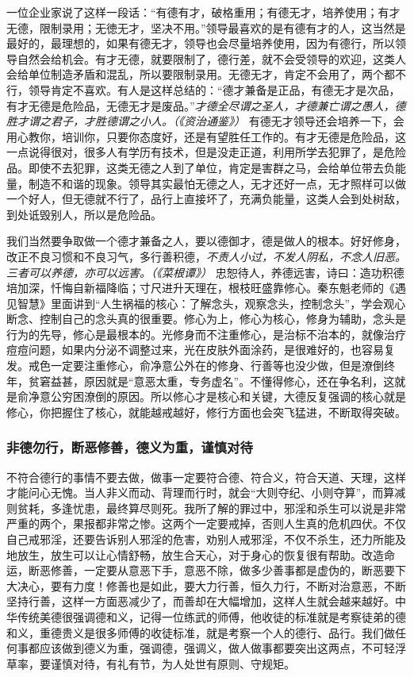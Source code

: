 一位企业家说了这样一段话：“有德有才，破格重用；有德无才，培养使用；有才无德，限制录用；无徳无才，坚决不用。”领导最喜欢的是有德有才的人，这当然是最好的，最理想的，如果有德无才，领导也会尽量培养使用，因为有德行，所以领导自然会给机会。有才无德，就要限制了，德行差，就不会受领导的欢迎，这类人会给单位制造矛盾和混乱，所以要限制录用。无德无才，肯定不会用了，两个都不行，领导肯定不喜欢。有人是这样总结的：“德才兼备是正品，有德无才是次品，有才无德是危险品，无德无才是废品。”\textit{才德全尽谓之圣人，才德兼亡谓之愚人，德胜才谓之君子，才胜德谓之小人。（《资治通鉴》）} 有德无才领导还会培养一下，会用心教你，培训你，只要你态度好，还是有望胜任工作的。有才无德是危险品，这一点说得很对，很多人有学历有技术，但是没走正道，利用所学去犯罪了，是危险品。即使不去犯罪，这类无德之人到了单位，肯定是害群之马，会给单位带去负能量，制造不和谐的现象。领导其实最怕无德之人，无才还好一点，无才照样可以做一个好人，但无德就不行了，品行上直接坏了，充满负能量，这类人会到处树敌，到处诋毁别人，所以是危险品。

我们当然要争取做一个德才兼备之人，要以德御才，德是做人的根本。好好修身，改正不良习惯和不良习气，多行善积德，\textit{不责人小过，不发人阴私，不念人旧恶。三者可以养德，亦可以远害。（《菜根谭》）} 忠恕待人，养德远害，诗曰：造功积德培加深，忏悔自新福降临；寸尺进升天理在，根枝旺盛靠修心。秦东魁老师的《遇见智慧》里面讲到“人生祸福的核心：了解念头，观察念头，控制念头”，学会观心断念、控制自己的念头真的很重要。修心为上，修心为核心，修身为辅助，念头是行为的先导，修心是最根本的。光修身而不注重修心，是治标不治本的，就像治疗痘痘问题，如果内分泌不调整过来，光在皮肤外面涂药，是很难好的，也容易复发。戒色一定要注重修心，俞净意公外在的修身、行善等也没少做，但是潦倒终年，贫窘益甚，原因就是“意恶太重，专务虚名”。不懂得修心，还在争名利，这就是俞净意公穷困潦倒的原因。所以修心才是核心和关键，大德反复强调的核心就是修心，你把握住了核心，就能越戒越好，修行方面也会突飞猛进，不断取得突破。

\subsubsection{非德勿行，断恶修善，德义为重，谨慎对待}

不符合德行的事情不要去做，做事一定要符合德、符合义，符合天道、天理，这样才能问心无愧。当人非义而动、背理而行时，就会“大则夺纪、小则夺算”，而算减则贫耗，多逢忧患，最终算尽则死。我所了解的罪过中，邪淫和杀生可以说是非常严重的两个，果报都非常之惨。这两个一定要戒掉，否则人生真的危机四伏。不仅自己戒邪淫，还要告诉别人邪淫的危害，劝别人戒邪淫，不仅不杀生，还力所能及地放生，放生可以让心情舒畅，放生合天心，对于身心的恢复很有帮助。改造命运，断恶修善，一定要从意恶下手，意恶不除，做多少善事都是虚伪的，断恶要下大决心，要有力度！修善也是如此，要大力行善，恒久力行，不断对治意恶，不断坚持行善，这样一方面恶减少了，而善却在大幅增加，这样人生就会越来越好。中华传统美德很强调德和义，记得一位练武的师傅，他收徒的标准就是考察徒弟的德和义，重德贵义是很多师傅的收徒标准，就是考察一个人的德行、品行。我们做任何事都应该做到德义为重，强调德，强调义，做人做事都要突出这两点，不可轻浮草率，要谨慎对待，有礼有节，为人处世有原则、守规矩。

